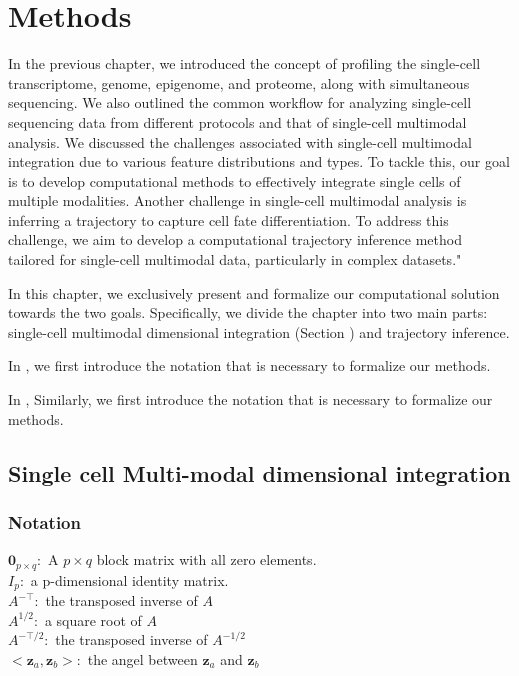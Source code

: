 
\chapter{Methods}
\label{chapter:methods}
\graphicspath{{chapter3/figs}}

In the previous chapter, we introduced the concept of profiling the single-cell transcriptome, genome, epigenome, and proteome, along with simultaneous sequencing. We also outlined the common workflow for analyzing single-cell sequencing data from different protocols and that of single-cell multimodal analysis. We discussed the challenges associated with single-cell multimodal integration due to various feature distributions and types. To tackle this, our goal is to develop computational methods to effectively integrate single cells of multiple modalities. Another challenge in single-cell multimodal analysis is inferring a trajectory to capture cell fate differentiation. To address this challenge, we aim to develop a computational trajectory inference method tailored for single-cell multimodal data, particularly in complex datasets."

In this chapter, we exclusively present and formalize our computational solution towards the two goals. Specifically, we divide the chapter into two main parts: single-cell multimodal dimensional integration (Section ) and trajectory inference.

In , we first introduce the notation that is necessary to formalize our methods.

In , Similarly, we first introduce the notation that is necessary to formalize our methods.


\section{Single cell Multi-modal dimensional integration}
\label{methods:integration}
\subsection{Notation}
$\mathbf{0}_{p\times q}: $ A $p\times q$ block matrix with all zero elements.\\
$I_p:$ a p-dimensional identity matrix.\\
$A^{-\top}:$ the transposed inverse of $A$\\
$A^{1/2}:$ a square root of $A$\\
$A^{-\top/2}:$ the transposed inverse of $A^{-1/2}$\\
$<\mathbf{z}_a, \mathbf{z}_b>:$ the angel between $\mathbf{z}_a$ and $\mathbf{z}_b$


